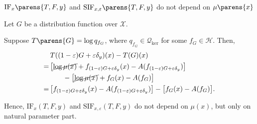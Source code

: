 \documentclass[aspectratio=169,xcolor=dvipsnames]{beamer}
\begin{document}
\begin{frame}{$\mathrm{IF}_x \parens{T, F, y}$ and $\mathrm{SIF}_{x, \varepsilon} \parens{T, F, y}$ do {\color{red} not} depend on $\mu \parens{x}$}
	
	Let $G$ be a distribution function over $\mathcal{X}$. 
	
	\vspace{10pt}
	
	Suppose $T \parens{G} = \log q_{f_G}$, where $q_{f_G} \in \mathcal{Q}_{\mathrm{ker}}$ for some $f_G \in \mathcal{H}$. Then, 
	\begin{align*}
		& \, T ( (1 - \varepsilon) G + \varepsilon \delta_y ) (x) - T (G) (x) \\ 
		= & \, \big[ \cancel{\log \mu (x)} + f_{(1 - \varepsilon) G + \varepsilon \delta_y} (x) - A (f_{(1 - \varepsilon) G + \varepsilon \delta_y}) \big] \\ 
		& \qquad - \big[ \cancel{\log \mu (x)} + f_{G} (x) - A (f_{G}) \big] \\
		= & \, \big[ f_{(1 - \varepsilon) G + \varepsilon \delta_y} (x) - A (f_{(1 - \varepsilon) G + \varepsilon \delta_y}) \big] - \big[ f_{G} (x) - A (f_{G}) \big]. 
	\end{align*}
	
	\vspace{10pt}
	
	Hence, $\mathrm{IF}_x (T, F, y)$ and $\mathrm{SIF}_{x, \varepsilon} (T, F, y)$ do {\color{red} not} depend on $\mu (x)$, but only on natural parameter part. 
	
\end{frame}


\end{document}

